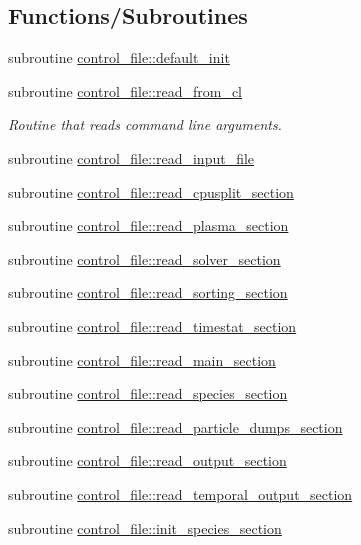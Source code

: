 \subsection*{Functions/\+Subroutines}
\begin{DoxyCompactItemize}
\item 
subroutine \hyperlink{namespacecontrol__file_a80a60361388cc26b8fe06e18e81dc50a}{control\+\_\+file\+::default\+\_\+init}
\item 
subroutine \hyperlink{namespacecontrol__file_afa9aa95463bcdfe5197ba2ac94793e9f}{control\+\_\+file\+::read\+\_\+from\+\_\+cl}
\begin{DoxyCompactList}\small\item\em Routine that reads command line arguments. \end{DoxyCompactList}\item 
subroutine \hyperlink{namespacecontrol__file_a12ed3f461d585d4199bd6d079a5d74c3}{control\+\_\+file\+::read\+\_\+input\+\_\+file}
\item 
subroutine \hyperlink{namespacecontrol__file_a488db4847d7ab565187470e915cfcb81}{control\+\_\+file\+::read\+\_\+cpusplit\+\_\+section}
\item 
subroutine \hyperlink{namespacecontrol__file_ac9b9d61786de32de87c8ddee39a0ac8c}{control\+\_\+file\+::read\+\_\+plasma\+\_\+section}
\item 
subroutine \hyperlink{namespacecontrol__file_ac65dc6ab5ac3863b22d480b2f9ce1b3b}{control\+\_\+file\+::read\+\_\+solver\+\_\+section}
\item 
subroutine \hyperlink{namespacecontrol__file_a76aeb0fb2e335ba8495d28bbca1bd6e4}{control\+\_\+file\+::read\+\_\+sorting\+\_\+section}
\item 
subroutine \hyperlink{namespacecontrol__file_af10502f8b6dd7152860ce78ddc0f4ff3}{control\+\_\+file\+::read\+\_\+timestat\+\_\+section}
\item 
subroutine \hyperlink{namespacecontrol__file_a88006372b7d91fbde08778111f02fd97}{control\+\_\+file\+::read\+\_\+main\+\_\+section}
\item 
subroutine \hyperlink{namespacecontrol__file_a76b277dd7c336fdc4ff255f1f1e23365}{control\+\_\+file\+::read\+\_\+species\+\_\+section}
\item 
subroutine \hyperlink{namespacecontrol__file_abe9d14779d86f200329241b34ba94b33}{control\+\_\+file\+::read\+\_\+particle\+\_\+dumps\+\_\+section}
\item 
subroutine \hyperlink{namespacecontrol__file_a8beaa20ec4cf16cbc533182a9500f5a3}{control\+\_\+file\+::read\+\_\+output\+\_\+section}
\item 
subroutine \hyperlink{namespacecontrol__file_a37549c37c459c5e8ffa18cb84a7116f8}{control\+\_\+file\+::read\+\_\+temporal\+\_\+output\+\_\+section}
\item 
subroutine \hyperlink{namespacecontrol__file_a1cd090a937bb673f043a85221c21f8a7}{control\+\_\+file\+::init\+\_\+species\+\_\+section}
\end{DoxyCompactItemize}
